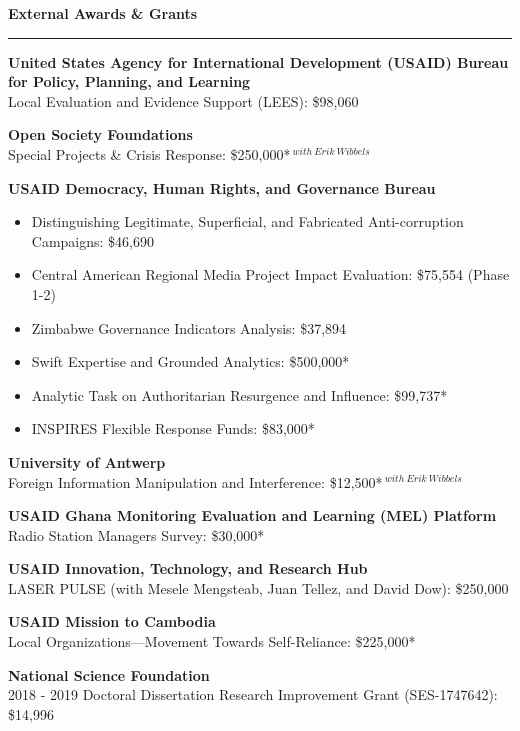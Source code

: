 \documentclass[11pt]{article}
\begin{document}
\bigskip
\textbf{\large External Awards \& Grants}\\
\rule[3mm]{\textwidth}{.2pt}
\textbf{United States Agency for International Development (USAID) Bureau for Policy, Planning, and Learning}\\
\hspace{1em} Local Evaluation and Evidence Support (LEES): \$98,060

\textbf{Open Society Foundations}\\
\hspace{1em} Special Projects \& Crisis Response: \$250,000*$^{\ with\ Erik\ Wibbels}$
\bigskip

\textbf{USAID Democracy, Human Rights, and Governance Bureau}
\begin{itemize} \itemsep -5pt
\item Distinguishing Legitimate, Superficial, and Fabricated Anti-corruption Campaigns: \$46,690
\item Central American Regional Media Project Impact Evaluation: \$75,554 (Phase 1-2)
\item Zimbabwe Governance Indicators Analysis: \$37,894
\item Swift Expertise and Grounded Analytics: \$500,000*
\item Analytic Task on Authoritarian Resurgence and Influence: \$99,737*
\item INSPIRES Flexible Response Funds: \$83,000*
\end{itemize}

\textbf{University of Antwerp}\\
\hspace{1em} Foreign Information Manipulation and Interference: \$12,500*$^{\ with\ Erik\ Wibbels}$

\textbf{USAID Ghana Monitoring Evaluation and Learning (MEL) Platform}\\
Radio Station Managers Survey: \$30,000*

\textbf{USAID Innovation, Technology, and Research Hub}\\
LASER PULSE (with Mesele Mengsteab, Juan Tellez, and David Dow): \$250,000

\textbf{USAID Mission to Cambodia}\\
Local Organizations—Movement Towards Self-Reliance: \$225,000*

\textbf{National Science Foundation}\\
2018 - 2019 Doctoral Dissertation Research Improvement Grant (SES-1747642): \$14,996
\end{document}
